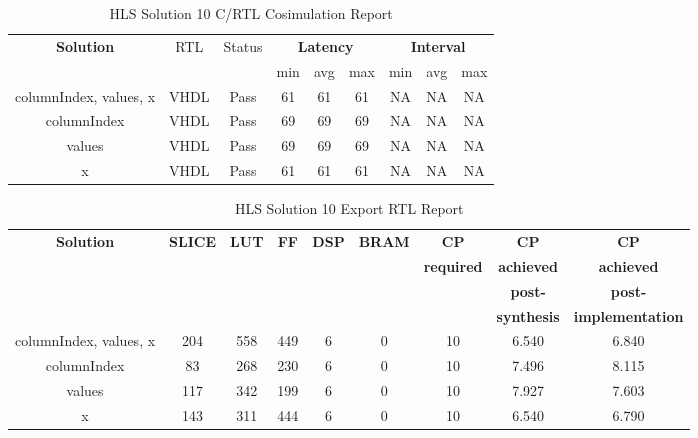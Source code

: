 \begin{table}[H]
	\centering
	\begin{tabular}{|c|c|c|c|c|c|c|c|c|}
		\hline
		\multicolumn{1}{|c|}{\textbf{Solution}} & \multicolumn{1}{|c|}{RTL} & \multicolumn{1}{|c|}{Status} & \multicolumn{3}{c|}{\textbf{Latency}} & \multicolumn{3}{c|}{\textbf{Interval}} \\
		& &  & min & avg & max & min & avg & max \\
		\hline
		columnIndex, values, x & VHDL & Pass & 61 & 61 & 61 & NA & NA & NA \\
		\hline
		columnIndex & VHDL & Pass & 69 & 69 & 69 & NA & NA & NA \\
		\hline
		values & VHDL & Pass & 69 & 69 & 69 & NA & NA & NA \\
		\hline
		x & VHDL & Pass & 61 & 61 & 61 & NA & NA & NA \\
		\hline
	\end{tabular}
	\caption{HLS Solution 10 C/RTL Cosimulation Report }
	\label{tab:hls-solution-10-cosimulation-report}
\end{table}

\begin{table}[H]
	\centering
	\begin{tabular}{|c|c|c|c|c|c|c|c|c|}
		\hline
		\textbf{Solution} & \textbf{SLICE} & \textbf{LUT} & \textbf{FF} & \textbf{DSP} & \textbf{BRAM} & \textbf{CP} & \textbf{CP} & \textbf{CP} \\
		& & & & & & \textbf{required} & \textbf{achieved} & \textbf{achieved}\\
		& & & & & & & \textbf{post-} & \textbf{post-}\\
		& & & & & & & \textbf{synthesis} & \textbf{implementation}\\
		\hline
		columnIndex, values, x  & 204 & 558 & 449 & 6 & 0 & 10 & 6.540 & 6.840 \\
		\hline
		columnIndex  & 83 & 268 & 230 & 6 & 0 & 10 & 7.496 & 8.115 \\
		\hline
		values  & 117 & 342 & 199 & 6 & 0 & 10 & 7.927 & 7.603 \\
		\hline
		x  & 143 & 311 & 444 & 6 & 0 & 10 & 6.540 & 6.790 \\
		\hline
	\end{tabular}
	\caption{HLS Solution 10 Export RTL Report}
	\label{tab:hls-solution-10-export-rtl-report}
\end{table}